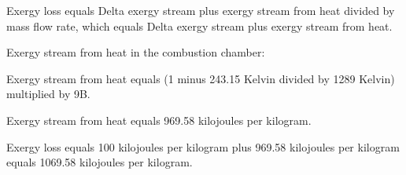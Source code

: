 Exergy loss equals Delta exergy stream plus exergy stream from heat divided by mass flow rate, which equals Delta exergy stream plus exergy stream from heat.  

Exergy stream from heat in the combustion chamber:  

Exergy stream from heat equals (1 minus 243.15 Kelvin divided by 1289 Kelvin) multiplied by 9B.  

Exergy stream from heat equals 969.58 kilojoules per kilogram.  

Exergy loss equals 100 kilojoules per kilogram plus 969.58 kilojoules per kilogram equals 1069.58 kilojoules per kilogram.